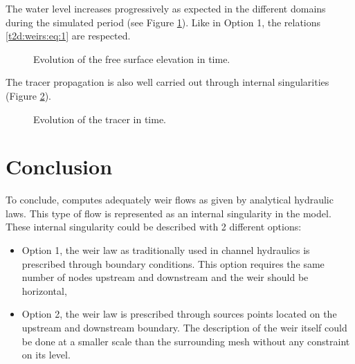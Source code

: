 The water level increases progressively as expected
in the different domains during the simulated period
(see Figure \ref{t2d:weirs2:fig:z}).
Like in Option 1, the relations \eqref{t2d:weirs:eq:1} are respected.

\begin{figure}[H]
 \centering
 \caption{Evolution of the free surface elevation in time.}
 \label{t2d:weirs2:fig:z}
\end{figure}

The tracer propagation is also well carried out through internal singularities
 (Figure \ref{t2d:weirs2:fig:tracer}).

\begin{figure}[H]
 \centering
 \caption{Evolution of the tracer in time.}
 \label{t2d:weirs2:fig:tracer}
\end{figure}

\section{Conclusion}
To conclude,  computes adequately weir
flows as given by analytical hydraulic laws.
This type of flow is represented as an internal
 singularity in the model.
These internal singularity could be described with 2 different options:
\begin{itemize}
\item Option 1, the weir law as traditionally used in channel hydraulics
 is prescribed through boundary conditions. This option requires the same
 number of nodes upstream and downstream and the weir should be horizontal,
\item Option 2, the weir law is prescribed through sources points located
 on the upstream and downstream boundary. The description of the weir itself
 could be done at a smaller scale than the surrounding mesh without any
 constraint on its level.
\end{itemize}

